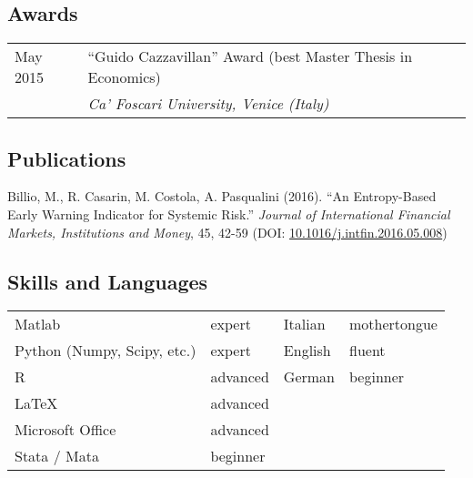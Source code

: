 \documentclass[a4paper,10pt]{article}
\newlength{\leftcolumn}
\newlength{\maincolumn}
\begin{document}
	\subsection*{Awards}
		\begin{tabular}{p{\leftcolumn}p{\maincolumn}}
			May 2015	& ``Guido Cazzavillan'' Award (best Master Thesis in Economics) \\
						& \emph{Ca' Foscari University, Venice (Italy)} \vspace{1em}
		\end{tabular}


	\subsection*{Publications}
		Billio, M., R. Casarin, M. Costola, A. Pasqualini (2016). ``An Entropy-Based Early Warning Indicator for Systemic Risk.'' \emph{Journal of International Financial Markets, Institutions and Money}, 45, 42-59 (DOI: \href{https://doi.org/10.1016/j.intfin.2016.05.008}{10.1016/j.intfin.2016.05.008})


	\subsection*{Skills and Languages}
		\begin{tabular}{p{4.5cm}p{2.5cm}p{2cm}p{2cm}}
			Matlab & expert 						& Italian & mothertongue \\
			Python (Numpy, Scipy, etc.) & expert	& English & fluent \\
			R & advanced                            & German  & beginner \\
			\LaTeX & advanced & & \\
			Microsoft Office & advanced & & \\
			Stata / Mata & beginner & &
		\end{tabular}

	\subsection*{}
\end{document}
